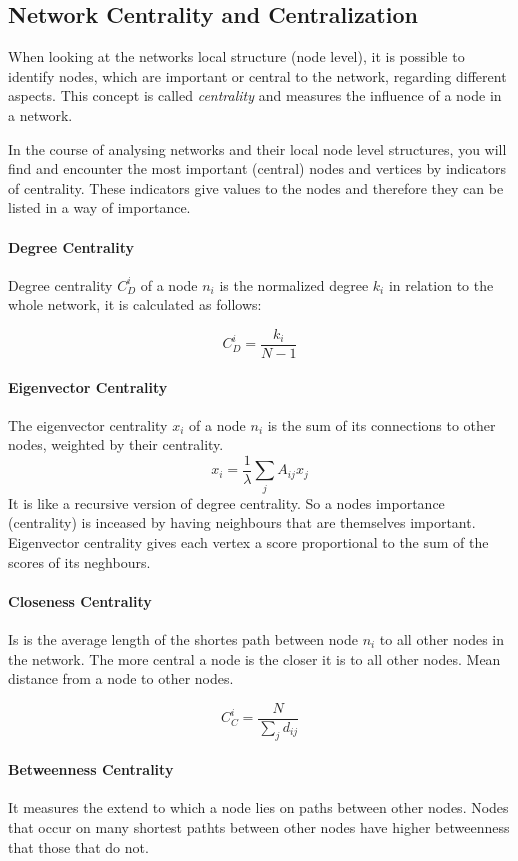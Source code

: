 \subsection{Network Centrality and Centralization}
When looking at the networks local structure (node level), it is possible to identify nodes, which are important or central to the network, regarding different aspects. This concept is called \emph{centrality} and measures the influence of a node in a network.~\cite{newman2010networks}

In the course of analysing networks and their local node level structures, you will find and encounter the most important (central) nodes and vertices by indicators of centrality. These indicators give values to the nodes and therefore they can be listed in a way of importance.

\paragraph{Degree Centrality}
Degree centrality $C^i_D$ of a node $n_i$ is the normalized degree $k_i$ in relation to the whole network, it is calculated as follows:

$$C^i_D=\frac{k_i}{N-1}$$

\paragraph{Eigenvector Centrality}
The eigenvector centrality $x_i$ of a node $n_i$ is the sum of its connections to other nodes, weighted by their centrality.
$$x_i= \frac{1}{\lambda}\sum_{j}A_{ij}x_j$$
It is like a recursive version of degree centrality. So a nodes importance (centrality) is inceased by having neighbours that are themselves important. Eigenvector centrality gives each vertex a score proportional to the sum of the scores of its neghbours.~\cite{newman2010networks}

\paragraph{Closeness Centrality}
Is is the average length of the shortes path between node $n_i$ to all other nodes in the network. The more central a node is the closer it is to all other nodes. Mean distance from a node to other nodes.~\cite{newman2010networks}

$$C_C^i=\frac{N}{\sum_{j}d_{ij}}$$

\paragraph{Betweenness Centrality}
It measures the extend to which a node lies on paths between other nodes. Nodes that occur on many shortest pathts between other nodes have higher betweenness that those that do not.


